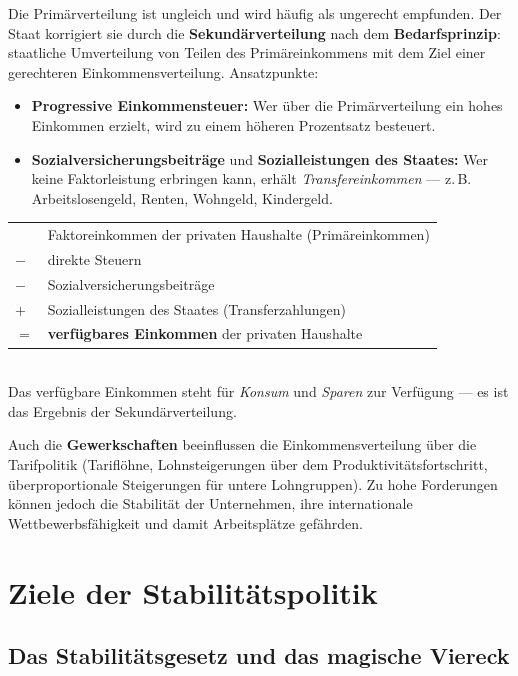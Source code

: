 \documentclass[11pt, a4paper]{article}
\begin{document}
Die Primärverteilung ist ungleich und wird häufig als ungerecht empfunden. Der Staat
korrigiert sie durch die \textbf{Sekundärverteilung} nach dem \textbf{Bedarfsprinzip}:
staatliche Umverteilung von Teilen des Primäreinkommens mit dem Ziel einer gerechteren
Einkommensverteilung. Ansatzpunkte:

\begin{itemize}
  \item \textbf{Progressive Einkommensteuer:} Wer über die Primärverteilung ein hohes
    Einkommen erzielt, wird zu einem höheren Prozentsatz besteuert.
  \item \textbf{Sozialversicherungsbeiträge} und \textbf{Sozialleistungen des Staates:}
    Wer keine Faktorleistung erbringen kann, erhält \emph{Transfereinkommen} --- z.\,B.
    Arbeitslosengeld, Renten, Wohngeld, Kindergeld.
\end{itemize}

\begin{merksatz}[title={\bfseries Formel: Verfügbares Einkommen der privaten Haushalte}]
\begin{tabular}{ll}
  & Faktoreinkommen der privaten Haushalte (Primäreinkommen)\\
$-$ & direkte Steuern\\
$-$ & Sozialversicherungsbeiträge\\
$+$ & Sozialleistungen des Staates (Transferzahlungen)\\
\midrule
$=$ & \textbf{verfügbares Einkommen} der privaten Haushalte
\end{tabular}\\[0.4em]
Das verfügbare Einkommen steht für \emph{Konsum} und \emph{Sparen} zur Verfügung ---
es ist das Ergebnis der Sekundärverteilung.
\end{merksatz}

Auch die \textbf{Gewerkschaften} beeinflussen die Einkommensverteilung über die
Tarifpolitik (Tariflöhne, Lohnsteigerungen über dem Produktivitätsfortschritt,
überproportionale Steigerungen für untere Lohngruppen). Zu hohe Forderungen können jedoch
die Stabilität der Unternehmen, ihre internationale Wettbewerbsfähigkeit und damit
Arbeitsplätze gefährden.

\section{Ziele der Stabilitätspolitik}

\subsection{Das Stabilitätsgesetz und das magische Viereck}
\end{document}
